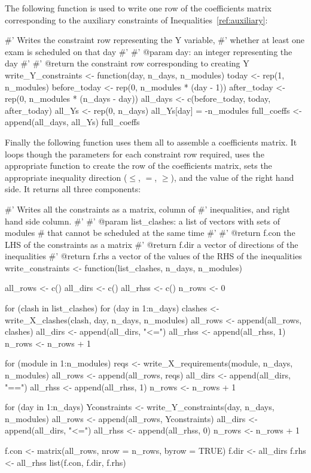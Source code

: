 The following function is used to write one row of the coefficients matrix corresponding to the auxiliary constraints of Inequalities~\ref{ref:auxiliary}:

\begin{Rin}
#' Writes the constraint row representing the Y variable,
#' whether at least one exam is scheduled on that day
#'
#' @param day: an integer representing the day
#'
#' @return the constraint row corresponding to creating Y
write_Y_constraints <- function(day, n_days, n_modules){
  today <- rep(1, n_modules)
  before_today <- rep(0, n_modules * (day - 1))
  after_today <- rep(0, n_modules * (n_days - day))
  all_days <- c(before_today, today, after_today)
  all_Ys <- rep(0, n_days)
  all_Ys[day] = -n_modules
  full_coeffs <- append(all_days, all_Ys)
  full_coeffs
}
\end{Rin}

Finally the following function uses them all to assemble a coefficients matrix.
It loops though the parameters for each constraint row required, uses the appropriate function to create the row of the coefficients matrix, sets the appropriate inequality direction ($\leq$, $=$, $\geq$), and the value of the right hand side.
It returns all three components:

\begin{Rin}
#' Writes all the constraints as a matrix, column of
#' inequalities, and right hand side column.
#'
#' @param list_clashes: a list of vectors with sets of modules
#         that cannot be scheduled at the same time
#'
#' @return f.con the LHS of the constraints as a matrix
#' @return f.dir a vector of directions of the inequalities
#' @return f.rhs a vector of the values of the RHS of the inequalities
write_constraints <- function(list_clashes, n_days, n_modules){
  all_rows <- c()
  all_dirs <- c()
  all_rhss <- c()
  n_rows <- 0
  
  for (clash in list_clashes){
    for (day in 1:n_days){
      clashes <- write_X_clashes(clash, day, n_days, n_modules)
      all_rows <- append(all_rows, clashes)
      all_dirs <- append(all_dirs, "<=")
      all_rhss <- append(all_rhss, 1)
      n_rows <- n_rows + 1
    }
  }
  
  for (module in 1:n_modules){
    reqs <- write_X_requirements(module, n_days, n_modules)
    all_rows <- append(all_rows, reqs)
    all_dirs <- append(all_dirs, "==")
    all_rhss <- append(all_rhss, 1)
    n_rows <- n_rows + 1
  }
  
  for (day in 1:n_days){
    Yconstraints <- write_Y_constraints(day, n_days, n_modules)
    all_rows <- append(all_rows, Yconstraints)
    all_dirs <- append(all_dirs, "<=")
    all_rhss <- append(all_rhss, 0)
    n_rows <- n_rows + 1
  }
  
  f.con <- matrix(all_rows, nrow = n_rows, byrow = TRUE)
  f.dir <- all_dirs
  f.rhs <- all_rhss
  list(f.con, f.dir, f.rhs)
}
\end{Rin}


